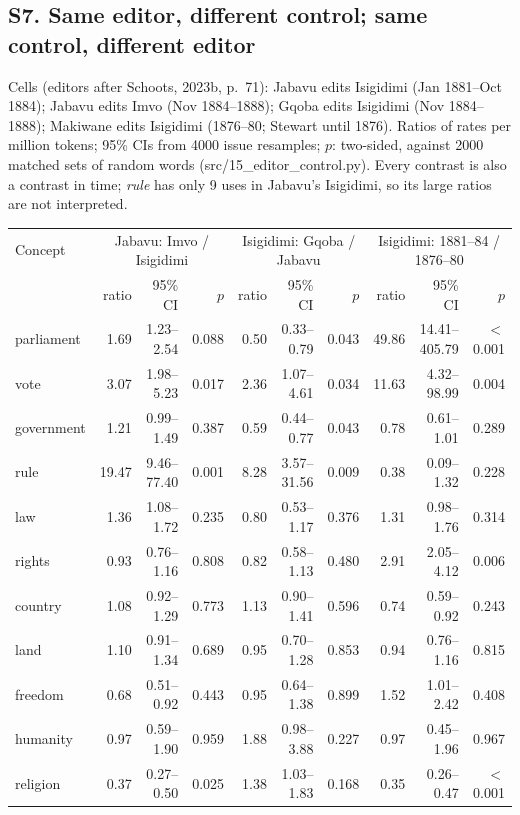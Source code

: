 \documentclass[10pt,letterpaper]{article}
\begin{document}
\subsection*{S7. Same editor, different control; same control, different editor}
Cells (editors after Schoots, 2023b, p.~71): Jabavu edits Isigidimi (Jan 1881--Oct 1884); Jabavu edits Imvo (Nov 1884--1888); Gqoba edits Isigidimi (Nov 1884--1888); Makiwane edits Isigidimi (1876--80; Stewart until 1876). Ratios of rates per million tokens; 95\% CIs from 4000 issue resamples; $p$: two-sided, against 2000 matched sets of random words (src/15\_editor\_control.py). Every contrast is also a contrast in time; \emph{rule} has only 9 uses in Jabavu's Isigidimi, so its large ratios are not interpreted.\\[2pt]
\begin{tabular}{@{}lrrrrrrrrr@{}}
\toprule
Concept & \multicolumn{3}{c}{Jabavu: Imvo / Isigidimi} & \multicolumn{3}{c}{Isigidimi: Gqoba / Jabavu} & \multicolumn{3}{c}{Isigidimi: 1881--84 / 1876--80} \\
 & ratio & 95\% CI & $p$ & ratio & 95\% CI & $p$ & ratio & 95\% CI & $p$ \\ \midrule
parliament & 1.69 & 1.23--2.54 & 0.088 & 0.50 & 0.33--0.79 & 0.043 & 49.86 & 14.41--405.79 & $<$0.001 \\
vote & 3.07 & 1.98--5.23 & 0.017 & 2.36 & 1.07--4.61 & 0.034 & 11.63 & 4.32--98.99 & 0.004 \\
government & 1.21 & 0.99--1.49 & 0.387 & 0.59 & 0.44--0.77 & 0.043 & 0.78 & 0.61--1.01 & 0.289 \\
rule & 19.47 & 9.46--77.40 & 0.001 & 8.28 & 3.57--31.56 & 0.009 & 0.38 & 0.09--1.32 & 0.228 \\
law & 1.36 & 1.08--1.72 & 0.235 & 0.80 & 0.53--1.17 & 0.376 & 1.31 & 0.98--1.76 & 0.314 \\
rights & 0.93 & 0.76--1.16 & 0.808 & 0.82 & 0.58--1.13 & 0.480 & 2.91 & 2.05--4.12 & 0.006 \\
country & 1.08 & 0.92--1.29 & 0.773 & 1.13 & 0.90--1.41 & 0.596 & 0.74 & 0.59--0.92 & 0.243 \\
land & 1.10 & 0.91--1.34 & 0.689 & 0.95 & 0.70--1.28 & 0.853 & 0.94 & 0.76--1.16 & 0.815 \\
freedom & 0.68 & 0.51--0.92 & 0.443 & 0.95 & 0.64--1.38 & 0.899 & 1.52 & 1.01--2.42 & 0.408 \\
humanity & 0.97 & 0.59--1.90 & 0.959 & 1.88 & 0.98--3.88 & 0.227 & 0.97 & 0.45--1.96 & 0.967 \\
religion & 0.37 & 0.27--0.50 & 0.025 & 1.38 & 1.03--1.83 & 0.168 & 0.35 & 0.26--0.47 & $<$0.001 \\
\bottomrule
\end{tabular}
\end{document}
